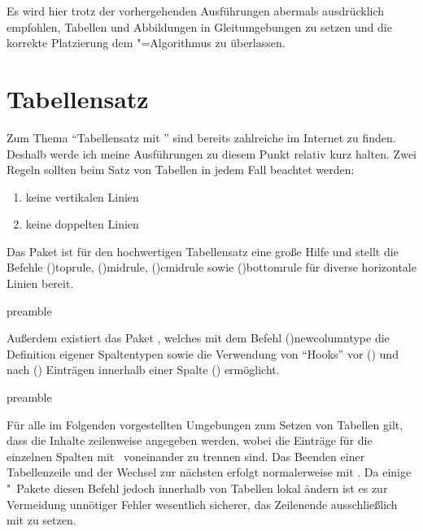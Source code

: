 \documentclass[%
  english,ngerman,%
  cdgeometry=no,DIV=12,%
  cd=false,cdfont=false,cdtitle=true,%
  headings=normal,%
  automark,%
  listof=toc,%
]{tudscrartcl}
\begin{document}
Es wird hier trotz der vorhergehenden Ausführungen abermals ausdrücklich 
empfohlen, Tabellen und Abbildungen in Gleitumgebungen zu setzen und die 
korrekte Platzierung dem "=Algorithmus zu überlassen.



\section{%
  Tabellensatz%
  \label{sec:tables}%
}

Zum Thema \enquote{Tabellensatz mit } sind bereits zahlreiche 
\cite{reichert2012} im Internet zu finden. Deshalb werde ich meine Ausführungen 
zu diesem Punkt relativ kurz halten. Zwei Regeln sollten beim Satz von Tabellen 
in jedem Fall beachtet werden:
%
\begin{enumerate}[%
  itemindent=0pt,noitemsep,%
  labelwidth=*,labelsep=1em,label=\Roman*.%
]
\item keine vertikalen Linien
\item keine doppelten Linien
\end{enumerate}

Das Paket  ist für den hochwertigen Tabellensatz eine große 
Hilfe und stellt die Befehle \Macro(){toprule}, 
\Macro(){midrule}, \Macro(){cmidrule} 
sowie \Macro(){bottomrule} für diverse horizontale Linien 
bereit.
%
\begin{Code}{preamble}
\usepackage{booktabs}
\end{Code}

Außerdem existiert das Paket , welches mit dem Befehl 
\Macro(){newcolumntype} die Definition eigener Spaltentypen 
sowie die Verwendung von \enquote{Hooks} vor (\PValue{>\MPValue{\dots}}) und 
nach (\PValue{<\MPValue{\dots}}) Einträgen innerhalb einer Spalte 
(\PValue{>\MPValue{\dots}}\PValue{<\MPValue{\dots}}) 
ermöglicht.
%
\begin{Code}{preamble}
\usepackage{array}
\end{Code}

Für alle im Folgenden vorgestellten Umgebungen zum Setzen von Tabellen gilt, 
dass die Inhalte zeilenweise angegeben werden, wobei die Einträge für die 
einzelnen Spalten mit~\PValue{\&} voneinander zu trennen sind. Das Beenden 
einer Tabellenzeile und der Wechsel zur nächsten erfolgt normalerweise mit 
\PValue{\bsc\bsc}. Da einige "~Pakete diesen Befehl jedoch 
innerhalb von Tabellen lokal ändern ist es zur Vermeidung unnötiger Fehler 
wesentlich sicherer, das Zeilenende ausschließlich mit  
zu setzen.
\end{document}
